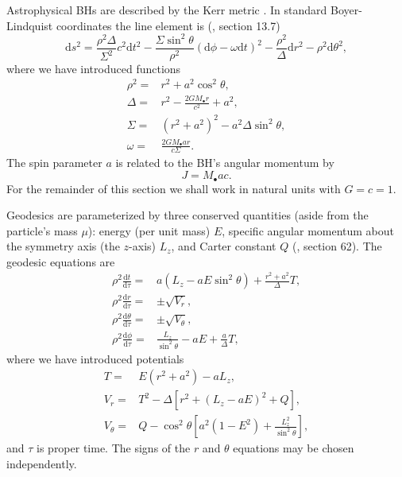 \documentclass[useAMS,usedcolumn,usegraphicx,usenatbib]{mn2e}
\newcommand{\dd}{\ensuremath{\mathrm{d}}}
\newcommand{\diff}[2]{\ensuremath{\frac{\dd {#1}}{\dd {#2}}}}
\begin{document}
Astrophysical BHs are described by the Kerr metric \citep{Kerr1963}. In standard Boyer-Lindquist coordinates the line element is (\citealt{Boyer1967, Hobson2006}, section 13.7)
\begin{equation}
\dd s^2 = \frac{\rho^2 \Delta}{\Sigma^2}c^2\dd t^2 - \frac{\Sigma \sin^2 \theta}{\rho^2}\left(\dd \phi - \omega \dd t\right)^2 - \frac{\rho^2}{\Delta}\dd r^2 - \rho^2\dd \theta^2,
\end{equation}
where we have introduced functions
\begin{align}
\rho^2 = {} & r^2 + a^2\cos^2\theta,\\
\Delta = {} & r^2 - \frac{2GM_\bullet r}{c^2} + a^2,\\
\Sigma = {} & \left(r^2 +a^2\right)^2 - a^2\Delta\sin^2\theta,\\
\omega = {} & \frac{2GM_\bullet ar}{c\Sigma}.
\end{align}
The spin parameter $a$ is related to the BH's angular momentum by
\begin{equation}
J = M_\bullet ac.
\end{equation}
For the remainder of this section we shall work in natural units with $G = c = 1$.

Geodesics are parameterized by three conserved quantities (aside from the particle's mass $\mu$): energy (per unit mass) $E$, specific angular momentum about the symmetry axis (the $z$-axis) $L_z$, and Carter constant $Q$ (\citealt{Carter1968, Chandrasekhar1998}, section 62). The geodesic equations are
\begin{align}
\rho^2 \diff{t}{\tau} = {} & a\left(L_z - aE\sin^2 \theta\right) + \frac{r^2 + a^2}{\Delta}T,\\
\rho^2 \diff{r}{\tau} = {} & \pm \sqrt{V_r},\\
\rho^2 \diff{\theta}{\tau} = {} & \pm \sqrt{V_\theta},\\
\rho^2 \diff{\phi}{\tau} = {} & \frac{L_z}{\sin^2 \theta} - aE + \frac{a}{\Delta}T,
\end{align}
where we have introduced potentials
\begin{align}
T = {} & E\left(r^2 +a^2\right) - aL_z,\\
V_r = {} & T^2 - \Delta\left[r^2 + \left(L_z -aE\right)^2 + Q\right],\\
V_\theta = {} & Q - \cos^2 \theta\left[a^2\left(1 - E^2\right) + \frac{L_z^2}{\sin^2\theta}\right],
\end{align}
and $\tau$ is proper time. The signs of the $r$ and $\theta$ equations may be chosen independently.
\end{document}
